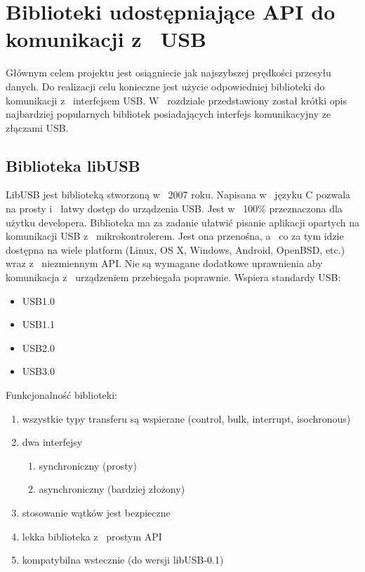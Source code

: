 \documentclass{BscUS}
\begin{document}
\chapter{Biblioteki udostępniające API do komunikacji z~ USB}
\label{librariesChapter}
Głównym celem projektu jest osiągniecie jak najszybszej prędkości przesyłu danych. Do realizacji celu konieczne jest użycie odpowiedniej biblioteki do komunikacji z~ interfejsem USB. W~ rozdziale przedstawiony został krótki opis najbardziej popularnych bibliotek posiadających interfejs komunikacyjny ze złączami USB.
\section{Biblioteka libUSB}
LibUSB \cite{libusbDesc} jest biblioteką stworzoną w~ 2007 roku. Napisana w~ języku C  pozwala na prosty i~ łatwy dostęp do urządzenia USB. Jest w~ 100\% przeznaczona dla użytku developera. Biblioteka ma za zadanie ułatwić pisanie aplikacji opartych na komunikacji USB z~ mikrokontrolerem.
Jest ona przenośna, a~ co za tym idzie dostępna na wiele platform (Linux, OS X, Windows, Android, OpenBSD, etc.) wraz z~ niezmiennym API.
Nie są wymagane dodatkowe uprawnienia aby komunikacja z~ urządzeniem przebiegała poprawnie.
Wspiera standardy USB: 
\begin{itemize}
\item USB1.0 
\item USB1.1 
\item USB2.0 
\item USB3.0
\end{itemize}
\noindent Funkcjonalność biblioteki:
\begin{enumerate}
\item wszystkie typy transferu są wspierane (control, bulk, interrupt, isochronous)
\item dwa interfejsy
\begin{enumerate}
\item synchroniczny (prosty)
\item asynchroniczny (bardziej złożony)
\end{enumerate}
\item stosowanie wątków jest bezpieczne
\item lekka biblioteka z~ prostym API
\item kompatybilna wstecznie (do wersji libUSB-0.1)
\end{enumerate}
\end{document}
